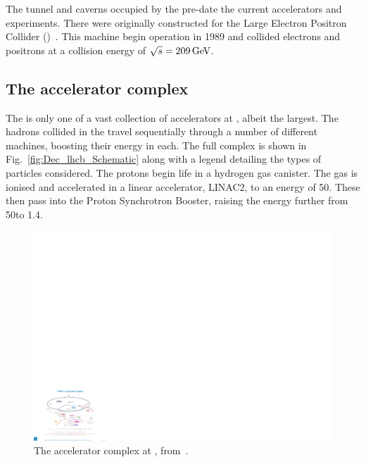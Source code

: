 The tunnel and caverns occupied by the \lhc pre-date the current accelerators and experiments. There were originally constructed for the Large Electron Positron Collider (\lep)~\cite{Myers:1991ym}. This machine begin operation in 1989 and collided electrons and positrons at a collision energy of $\sqrt{s}=209\mathrm{\,Ge\kern -0.1em V}$.  


\subsection{The accelerator complex}

The \lhc is only one of a vast collection of accelerators at \cern, albeit the largest. The hadrons collided in the \lhc travel sequentially through a number of different machines, boosting their energy in each. The full complex is shown in Fig.~\ref{fig:Dec_lhcb_Schematic} along with a legend detailing the types of particles considered. The protons begin life in a hydrogen gas canister. The gas is ionised and accelerated in  a linear accelerator, LINAC2, to an energy of 50\mev. These then pass into the Proton Synchrotron Booster, raising the energy further from 50\mev to 1.4\gev. 

\begin{figure}[!h]
    \centering
    \includegraphics[width=1.0\textwidth]{figs/Detector/Acc_complex.pdf}
    \caption{The accelerator complex at \cern, from~\cite{DeMelis:2119882}.}
    \label{fig:Dec_Acc_Complex}   
\end{figure}

